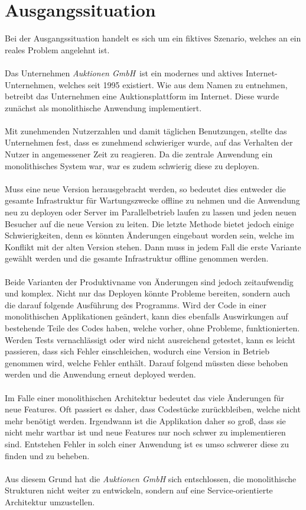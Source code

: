 \section{Ausgangssituation}
\label{sec:ausgangssituation}
Bei der Ausgangssituation handelt es sich um ein fiktives Szenario, welches an ein reales Problem angelehnt ist.
\\\\
Das Unternehmen \textit{Auktionen GmbH}\ ist ein modernes und aktives Internet-Unternehmen, welches seit 1995 existiert. Wie aus dem Namen zu entnehmen, betreibt das Unternehmen eine Auktionsplattform im Internet. Diese wurde zunächst als monolithische Anwendung implementiert.
\\\\
Mit zunehmenden Nutzerzahlen und damit täglichen Benutzungen, stellte das Unternehmen fest, dass es zunehmend schwieriger wurde, auf das Verhalten der Nutzer in angemessener Zeit zu reagieren. Da die zentrale Anwendung ein monolithisches System war, war es zudem schwierig diese zu deployen.
\\\\
Muss eine neue Version herausgebracht werden, so bedeutet dies entweder die gesamte Infrastruktur für Wartungszwecke offline zu nehmen und die Anwendung neu zu deployen oder Server im Parallelbetrieb laufen zu lassen und jeden neuen Besucher auf die neue Version zu leiten. Die letzte Methode bietet jedoch einige Schwierigkeiten, denn es könnten Änderungen eingebaut worden sein, welche im Konflikt mit der alten Version stehen. Dann muss in jedem Fall die erste Variante gewählt werden und die gesamte Infrastruktur offline genommen werden.
\\\\
Beide Varianten der Produktivname von Änderungen sind jedoch zeitaufwendig und komplex. Nicht nur das Deployen könnte Probleme bereiten, sondern auch die darauf folgende Ausführung des Programms. Wird der Code in einer monolithischen Applikationen geändert, kann dies ebenfalls Auswirkungen auf bestehende Teile des Codes haben, welche vorher, ohne Probleme, funktionierten. Werden Tests vernachlässigt oder wird nicht ausreichend getestet, kann es leicht passieren, dass sich Fehler einschleichen, wodurch eine Version in Betrieb genommen wird, welche Fehler enthält. Darauf folgend müssten diese behoben werden und die Anwendung erneut deployed werden.
\\\\
Im Falle einer monolithischen Architektur bedeutet das viele Änderungen für neue Features. Oft passiert es daher, dass Codestücke zurückbleiben, welche nicht mehr benötigt werden. Irgendwann ist die Applikation daher so groß, dass sie nicht mehr wartbar ist und neue Features nur noch schwer zu implementieren sind. Entstehen Fehler in solch einer Anwendung ist es umso schwerer diese zu finden und zu beheben.
\\\\
Aus diesem Grund hat die \textit{Auktionen GmbH} sich entschlossen, die monolithische Strukturen nicht weiter zu entwickeln, sondern auf eine Service-orientierte Architektur umzustellen.

